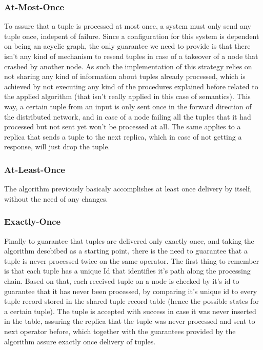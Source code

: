 \documentclass[times, 10pt,twocolumn]{article}
\newcommand{\forceindent}{\leavevmode{\parindent=1em\indent}}
\begin{document}



\subsubsection{At-Most-Once}

\forceindent To assure that a tuple is processed at most once, a system must only send
any tuple once, indepent of failure. Since a configuration for this system
is dependent on being an acyclic graph, the only guarantee we need to
provide is that there isn't any kind of mechanism to resend tuples in case
of a takeover of a node that crashed by another node.  As such the
implementation of this strategy relies on not sharing any kind of
information about tuples already processed, which is achieved by not executing
any kind of the procedures explained before related to the applied algorithm
(that isn't really applied in this case of semantics).
This way, a certain tuple from an input is only sent once in
the forward direction of the distributed network, and in case of a node
failing all the tuples that it had processed but not sent yet won't be
processed at all. The same applies to a replica that sends a tuple to the next
replica, which in case of not getting a response, will just drop the tuple.

\subsubsection{At-Least-Once}

\forceindent The algorithm previously basicaly accomplishes at least once
delivery by itself, without the need of any changes. 

\subsubsection{Exactly-Once}

\forceindent Finally to guarantee that tuples are delivered only exactly once, and taking
the algorithm descbibed as a starting point, there is the need to guarantee
that a tuple is never processed twice on the same operator. The first thing
to remember is that each tuple has a unique Id that identifies it's path
along the processing chain. Based on that, each received tuple on a node is
checked by it's id to guarantee that it has never been processed, by comparing
it's unique id to every tuple record stored in the shared tuple record table
(hence the possible states for a certain tuple).
The tuple is accepted with success in case it was never inserted in the table,
assuring the replica that the tuple was never processed and sent to next
operator before, which together with the guarantees provided by the algorithm
assure exactly once delivery of tuples.
\end{document}

